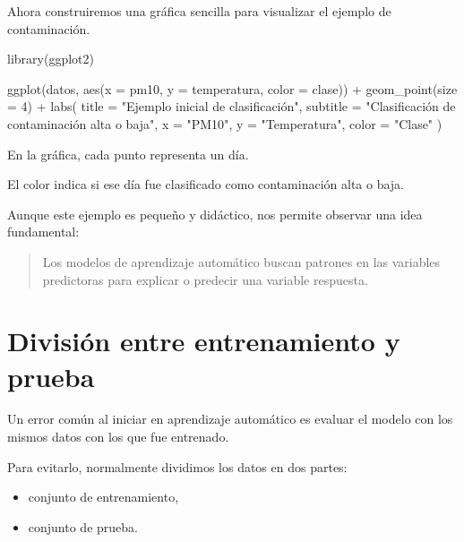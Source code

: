 \documentclass[
  11pt,
  letterpaper,
]{book}
\newenvironment{Shaded}{\begin{snugshade}}{\end{snugshade}}
\newcommand{\AttributeTok}[1]{\textcolor[rgb]{0.40,0.45,0.13}{#1}}
\newcommand{\DecValTok}[1]{\textcolor[rgb]{0.68,0.00,0.00}{#1}}
\newcommand{\FunctionTok}[1]{\textcolor[rgb]{0.28,0.35,0.67}{#1}}
\newcommand{\NormalTok}[1]{\textcolor[rgb]{0.00,0.23,0.31}{#1}}
\newcommand{\SpecialCharTok}[1]{\textcolor[rgb]{0.37,0.37,0.37}{#1}}
\newcommand{\StringTok}[1]{\textcolor[rgb]{0.13,0.47,0.30}{#1}}
\providecommand{\tightlist}{%
  \setlength{\itemsep}{0pt}\setlength{\parskip}{0pt}}
\begin{document}
Ahora construiremos una gráfica sencilla para visualizar el ejemplo de
contaminación.

\begin{Shaded}
\begin{Highlighting}[]
\FunctionTok{library}\NormalTok{(ggplot2)}

\FunctionTok{ggplot}\NormalTok{(datos, }\FunctionTok{aes}\NormalTok{(}\AttributeTok{x =}\NormalTok{ pm10, }\AttributeTok{y =}\NormalTok{ temperatura, }\AttributeTok{color =}\NormalTok{ clase)) }\SpecialCharTok{+}
  \FunctionTok{geom\_point}\NormalTok{(}\AttributeTok{size =} \DecValTok{4}\NormalTok{) }\SpecialCharTok{+}
  \FunctionTok{labs}\NormalTok{(}
    \AttributeTok{title =} \StringTok{"Ejemplo inicial de clasificación"}\NormalTok{,}
    \AttributeTok{subtitle =} \StringTok{"Clasificación de contaminación alta o baja"}\NormalTok{,}
    \AttributeTok{x =} \StringTok{"PM10"}\NormalTok{,}
    \AttributeTok{y =} \StringTok{"Temperatura"}\NormalTok{,}
    \AttributeTok{color =} \StringTok{"Clase"}
\NormalTok{  )}
\end{Highlighting}
\end{Shaded}

En la gráfica, cada punto representa un día.

El color indica si ese día fue clasificado como contaminación alta o
baja.

Aunque este ejemplo es pequeño y didáctico, nos permite observar una
idea fundamental:

\begin{quote}
Los modelos de aprendizaje automático buscan patrones en las variables
predictoras para explicar o predecir una variable respuesta.
\end{quote}

\section{División entre entrenamiento y
prueba}\label{divisiuxf3n-entre-entrenamiento-y-prueba}

Un error común al iniciar en aprendizaje automático es evaluar el modelo
con los mismos datos con los que fue entrenado.

Para evitarlo, normalmente dividimos los datos en dos partes:

\begin{itemize}
\tightlist
\item
  conjunto de entrenamiento,
\item
  conjunto de prueba.
\end{itemize}
\end{document}
